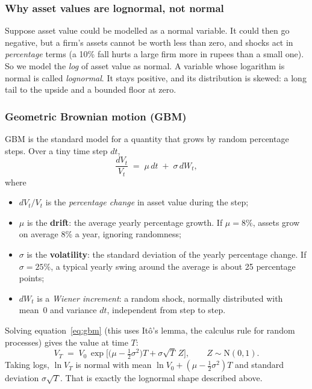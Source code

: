 \subsubsection{Why asset values are lognormal, not normal}
Suppose asset value could be modelled as a normal variable. It could then go negative, but a firm's assets cannot be worth less than zero, and shocks act in \emph{percentage} terms (a 10\% fall hurts a large firm more in rupees than a small one). So we model the \emph{log} of asset value as normal. A variable whose logarithm is normal is called \emph{lognormal}. It stays positive, and its distribution is skewed: a long tail to the upside and a bounded floor at zero.

\subsubsection{Geometric Brownian motion (GBM)}
GBM is the standard model for a quantity that grows by random percentage steps. Over a tiny time step $dt$,
\begin{equation}
\frac{dV_t}{V_t} \;=\; \mu\,dt \;+\; \sigma\,dW_t ,
\label{eq:gbm}
\end{equation}
where
\begin{itemize}
\item $dV_t/V_t$ is the \emph{percentage change} in asset value during the step;
\item $\mu$ is the \textbf{drift}: the average yearly percentage growth. If $\mu=8\%$, assets grow on average 8\% a year, ignoring randomness;
\item $\sigma$ is the \textbf{volatility}: the standard deviation of the yearly percentage change. If $\sigma=25\%$, a typical yearly swing around the average is about 25 percentage points;
\item $dW_t$ is a \emph{Wiener increment}: a random shock, normally distributed with mean~0 and variance $dt$, independent from step to step.
\end{itemize}
Solving equation~\eqref{eq:gbm} (this uses It\^o's lemma, the calculus rule for random processes) gives the value at time $T$:
\begin{equation}
V_T \;=\; V_0\,\exp\!\Big[\big(\mu-\tfrac12\sigma^2\big)T+\sigma\sqrt{T}\,Z\Big],\qquad Z\sim\text{N}(0,1).
\label{eq:gbmsol}
\end{equation}
Taking logs, $\ln V_T$ is normal with mean $\ln V_0+(\mu-\tfrac12\sigma^2)T$ and standard deviation $\sigma\sqrt T$. That is exactly the lognormal shape described above.


